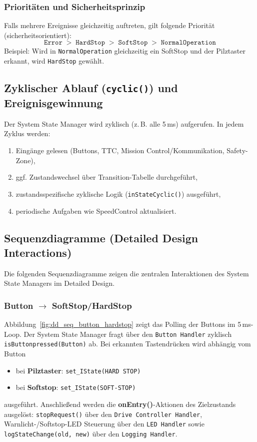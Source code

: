 \subsubsection{Prioritäten und Sicherheitsprinzip}
Falls mehrere Ereignisse gleichzeitig auftreten, gilt folgende Priorität (sicherheitsorientiert):
\[
  \texttt{Error} \;>\; \texttt{HardStop} \;>\; \texttt{SoftStop} \;>\; \texttt{NormalOperation}
\]
Beispiel: Wird in \texttt{NormalOperation} gleichzeitig ein SoftStop und der Pilztaster erkannt, wird \texttt{HardStop} gewählt.

\subsection{Zyklischer Ablauf (\texttt{cyclic()}) und Ereignisgewinnung}
Der System State Manager wird zyklisch (z.\,B. alle 5\,ms) aufgerufen. In jedem Zyklus werden:
\begin{enumerate}[leftmargin=*, itemsep=2pt]
  \item Eingänge gelesen (Buttons, TTC, Mission Control/Kommunikation, Safety-Zone),
  \item ggf. Zustandswechsel über Transition-Tabelle durchgeführt,
  \item zustandsspezifische zyklische Logik (\texttt{inStateCyclic()}) ausgeführt,
  \item periodische Aufgaben wie SpeedControl aktualisiert.
\end{enumerate}

\subsection{Sequenzdiagramme (Detailed Design Interactions)}
Die folgenden Sequenzdiagramme zeigen die zentralen Interaktionen des System State Managers im Detailed Design.

\subsubsection{Button $\rightarrow$ SoftStop/HardStop}
Abbildung~\ref{fig:dd_seq_button_hardstop} zeigt das Polling der Buttons im 5\,ms-Loop. Der System State Manager fragt über den
\texttt{Button Handler} zyklisch \texttt{isButtonpressed(Button)} ab. Bei erkannten Tastendrücken wird abhängig vom Button
\begin{itemize}[leftmargin=*, itemsep=2pt]
  \item bei \textbf{Pilztaster}: \texttt{set\_IState(HARD STOP)}
  \item bei \textbf{Softstop}: \texttt{set\_IState(SOFT-STOP)}
\end{itemize}
ausgeführt. Anschließend werden die \textbf{onEntry()}-Aktionen des Zielzustands ausgelöst:
\texttt{stopRequest()} über den \texttt{Drive Controller Handler}, Warnlicht-/Softstop-LED Steuerung über den \texttt{LED Handler}
sowie \texttt{logStateChange(old, new)} über den \texttt{Logging Handler}.

